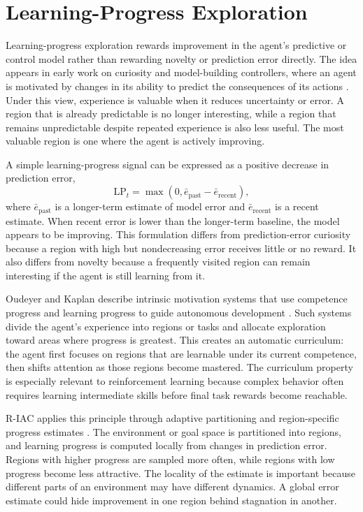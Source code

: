 \section{Learning-Progress Exploration}
\label{sec:learning_progress_exploration}

Learning-progress exploration rewards improvement in the agent's predictive or control model rather than rewarding novelty or prediction error directly.
The idea appears in early work on curiosity and model-building controllers, where an agent is motivated by changes in its ability to predict the consequences of its actions \parencite{schmidhuber-1991}.
Under this view, experience is valuable when it reduces uncertainty or error.
A region that is already predictable is no longer interesting, while a region that remains unpredictable despite repeated experience is also less useful.
The most valuable region is one where the agent is actively improving.

A simple learning-progress signal can be expressed as a positive decrease in prediction error,
\begin{equation}
    \mathrm{LP}_t = \max(0,\bar{e}_{\mathrm{past}}-\bar{e}_{\mathrm{recent}}),
\end{equation}
where $\bar{e}_{\mathrm{past}}$ is a longer-term estimate of model error and $\bar{e}_{\mathrm{recent}}$ is a recent estimate.
When recent error is lower than the longer-term baseline, the model appears to be improving.
This formulation differs from prediction-error curiosity because a region with high but nondecreasing error receives little or no reward.
It also differs from novelty because a frequently visited region can remain interesting if the agent is still learning from it.

Oudeyer and Kaplan describe intrinsic motivation systems that use competence progress and learning progress to guide autonomous development \parencite{oudeyer-2007A,oudeyer-2007B}.
Such systems divide the agent's experience into regions or tasks and allocate exploration toward areas where progress is greatest.
This creates an automatic curriculum: the agent first focuses on regions that are learnable under its current competence, then shifts attention as those regions become mastered.
The curriculum property is especially relevant to reinforcement learning because complex behavior often requires learning intermediate skills before final task rewards become reachable.

R-IAC applies this principle through adaptive partitioning and region-specific progress estimates \parencite{baranes-2009}.
The environment or goal space is partitioned into regions, and learning progress is computed locally from changes in prediction error.
Regions with higher progress are sampled more often, while regions with low progress become less attractive.
The locality of the estimate is important because different parts of an environment may have different dynamics.
A global error estimate could hide improvement in one region behind stagnation in another.

